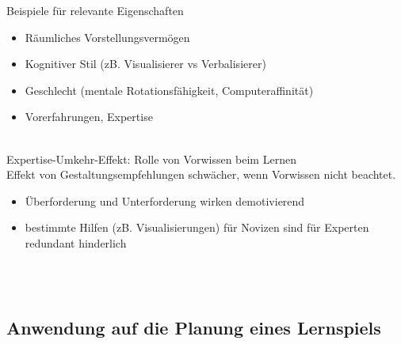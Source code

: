 \documentclass[a4paper]{article}
\begin{document}
Beispiele für relevante Eigenschaften
\begin{itemize}
	\item Räumliches Vorstellungsvermögen
	\item Kognitiver Stil (zB. Visualisierer vs Verbalisierer)
	\item Geschlecht (mentale Rotationsfähigkeit, Computeraffinität)
	\item Vorerfahrungen, Expertise
\end{itemize}
~\\
Expertise-Umkehr-Effekt: Rolle von Vorwissen beim Lernen\\
Effekt von Gestaltungsempfehlungen schwächer, wenn Vorwissen nicht beachtet.
\begin{itemize}
	\item Überforderung und Unterforderung wirken demotivierend
	\item bestimmte Hilfen (zB. Visualisierungen) für Novizen sind für Experten redundant \textrightarrow hinderlich
\end{itemize}
~\\~\\

\subsection{Anwendung auf die Planung eines Lernspiels}
\end{document}
